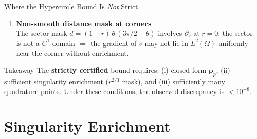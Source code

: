 \documentclass[10pt,aspectratio=169]{beamer}
\newcommand{\myalert}[1]{\textcolor{red!70!black}{#1}}
\begin{document}
\begin{frame}{Where the Hypercircle Bound Is \emph{Not} Strict}
\begin{enumerate}
    \item \textbf{Non-smooth distance mask at corners} \\
          The sector mask $d = (1-r)\,\theta\,(3\pi/2-\theta)$ involves
          $\partial_r$ at $r=0$; the sector is not a $C^1$ domain
          $\Rightarrow$ \myalert{the gradient of $v$ may not lie in
          $L^2(\Omega)$ uniformly near the corner} without enrichment.

  \end{enumerate}

  \medskip
  \begin{alertblock}{Takeaway}
    The \textbf{strictly certified} bound requires: (i) closed-form
    $\mathbf{p}_p$, (ii) sufficient singularity enrichment ($r^{2/3}$ mask),
    and (iii) sufficiently many quadrature points. Under these conditions,
    the observed discrepancy is $< 10^{-8}$.
  \end{alertblock}
\end{frame}

\section{Singularity Enrichment}
\end{document}
